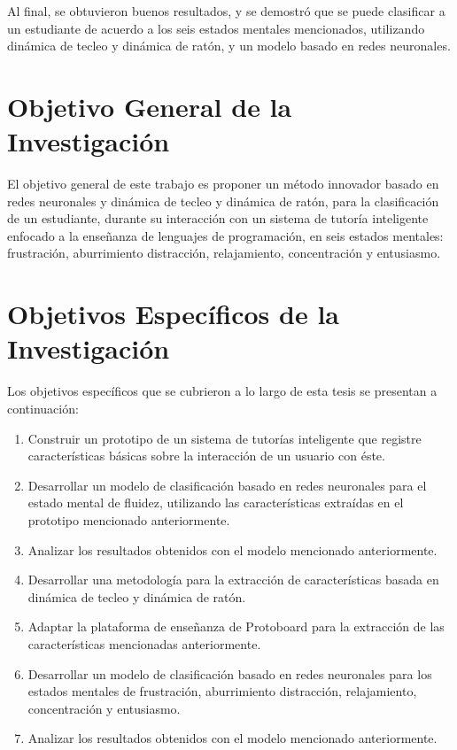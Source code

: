 Al final, se obtuvieron buenos resultados, y se demostró que se puede clasificar a un estudiante de acuerdo a los seis estados mentales mencionados, utilizando dinámica de tecleo y dinámica de ratón, y un modelo basado en redes neuronales.

\section{Objetivo General de la Investigación}

El objetivo general de este trabajo es proponer un método innovador basado en redes neuronales y dinámica de tecleo y dinámica de ratón, para la clasificación de un estudiante, durante su interacción con un sistema de tutoría inteligente enfocado a la enseñanza de lenguajes de programación, en seis estados mentales: frustración, aburrimiento distracción, relajamiento, concentración y entusiasmo.

\section{Objetivos Específicos de la Investigación}

Los objetivos específicos que se cubrieron a lo largo de esta tesis se presentan a continuación:

\begin{enumerate}
\item Construir un prototipo de un sistema de tutorías inteligente que registre características básicas sobre la interacción de un usuario con éste.
\item Desarrollar un modelo de clasificación basado en redes neuronales para el estado mental de fluidez, utilizando las características extraídas en el prototipo mencionado anteriormente.
\item Analizar los resultados obtenidos con el modelo mencionado anteriormente.
\item Desarrollar una metodología para la extracción de características basada en dinámica de tecleo y dinámica de ratón.
\item Adaptar la plataforma de enseñanza de Protoboard para la extracción de las características mencionadas anteriormente.
\item Desarrollar un modelo de clasificación basado en redes neuronales para los estados mentales de frustración, aburrimiento distracción, relajamiento, concentración y entusiasmo.
\item Analizar los resultados obtenidos con el modelo mencionado anteriormente.
\end{enumerate}

